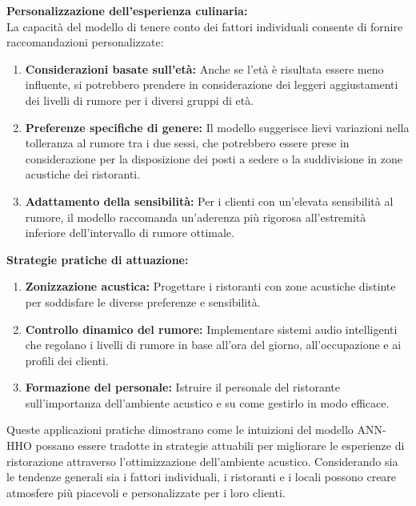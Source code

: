 \textbf{Personalizzazione dell'esperienza culinaria:} \\
La capacità del modello di tenere conto dei fattori individuali consente di fornire raccomandazioni personalizzate:
\begin{enumerate}
    \item \textbf{Considerazioni basate sull'età:} Anche se l'età è risultata essere meno influente, si potrebbero prendere in considerazione dei leggeri aggiustamenti dei livelli di rumore per i diversi gruppi di età.
    \item \textbf{Preferenze specifiche di genere:} Il modello suggerisce lievi variazioni nella tolleranza al rumore tra i due sessi, che potrebbero essere prese in considerazione per la disposizione dei posti a sedere o la suddivisione in zone acustiche dei ristoranti.
    \item \textbf{Adattamento della sensibilità:} Per i clienti con un'elevata sensibilità al rumore, il modello raccomanda un'aderenza più rigorosa all'estremità inferiore dell'intervallo di rumore ottimale.
\end{enumerate}

\textbf{Strategie pratiche di attuazione:}
\begin{enumerate}
    \item \textbf{Zonizzazione acustica:} Progettare i ristoranti con zone acustiche distinte per soddisfare le diverse preferenze e sensibilità.
    \item \textbf{Controllo dinamico del rumore:} Implementare sistemi audio intelligenti che regolano i livelli di rumore in base all'ora del giorno, all'occupazione e ai profili dei clienti.
    \item \textbf{Formazione del personale:} Istruire il personale del ristorante sull'importanza dell'ambiente acustico e su come gestirlo in modo efficace.
\end{enumerate}


Queste applicazioni pratiche dimostrano come le intuizioni del modello ANN-HHO possano essere tradotte in strategie attuabili per migliorare le esperienze di ristorazione attraverso l'ottimizzazione dell'ambiente acustico. Considerando sia le tendenze generali sia i fattori individuali, i ristoranti e i locali possono creare atmosfere più piacevoli e personalizzate per i loro clienti.


